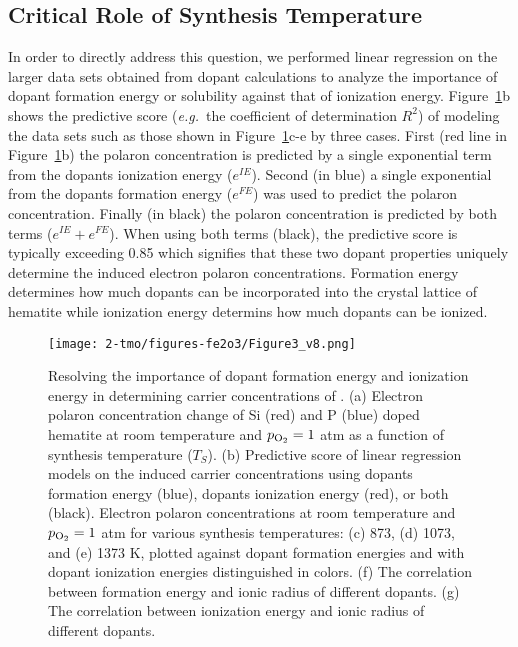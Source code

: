 \subsection{Critical Role of Synthesis Temperature}

 In order to directly address this question, we performed linear regression on the larger data sets obtained from dopant calculations to analyze the importance of dopant formation energy or solubility against that of ionization energy. %
 Figure~\ref{fig:trends}b shows the predictive score (\textit{e.g.}\ the coefficient of determination $R^2$) of modeling the data sets such as those shown in Figure~\ref{fig:trends}c-e by three cases. First (red line in Figure~\ref{fig:trends}b) the polaron concentration is predicted by a single exponential term from the dopants ionization energy ($e^{IE}$). Second (in blue) a single exponential from the dopants formation energy ($e^{FE}$) was used to predict the polaron concentration. Finally (in black) the polaron concentration is predicted by both terms ($e^{IE}+e^{FE}$).
 When using both terms (black), the predictive score is typically exceeding 0.85 which signifies that these two dopant properties uniquely determine the induced electron polaron concentrations. Formation energy determines how much dopants can be incorporated into the crystal lattice of hematite while ionization energy determins how much dopants can be ionized.

 \begin{figure}[H]
\centering
\texttt{[image: 2-tmo/figures-fe2o3/Figure3\_v8.png]}
\caption{
Resolving the importance of dopant formation energy and ionization energy in determining carrier concentrations of .
(a) Electron polaron concentration change of Si (red) and P (blue) doped hematite at room temperature and $p_{\rm O_2}=1$ atm as a function of synthesis temperature ($T_S$).
(b) Predictive score of linear regression models on the induced carrier concentrations using dopants formation energy (blue), dopants ionization energy (red), or both (black).
Electron polaron concentrations at room temperature and $p_{\rm O_2}=1$ atm for various synthesis temperatures: (c) 873, (d) 1073, and (e) 1373 K, plotted against dopant formation energies and with dopant ionization energies distinguished in colors. (f) The correlation between formation energy and ionic radius of different dopants. (g) The correlation between ionization energy and ionic radius of different dopants.
}
\label{fig:trends}
 \end{figure}


